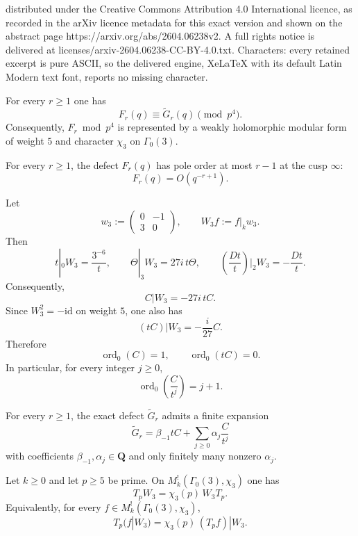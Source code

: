 \documentclass[10pt,a4paper]{amsart}
\DeclareMathOperator{\ord}{ord}
\newcommand{\Q}{\mathbf{Q}}
\begin{document}
distributed under the Creative Commons Attribution 4.0 International licence, as recorded in the arXiv licence metadata for this exact version and shown on the abstract page https://arxiv.org/abs/2604.06238v2. A full rights notice is delivered at licenses/arxiv-2604.06238-CC-BY-4.0.txt. Characters: every retained excerpt is pure ASCII, so the delivered engine, XeLaTeX with its default Latin Modern text font, reports no missing character.
\begin{proposition}\label{prop:defect-congruence}
For every $r\ge1$ one has
\[
F_r(q)\equiv \widetilde G_r(q)\pmod{p^4}.
\]
Consequently, $F_r\bmod p^4$ is represented by a weakly holomorphic modular form of weight $5$ and character $\chi_3$ on $\Gamma_0(3)$.
\end{proposition}

\begin{proposition}\label{prop:defect-pole-order}
For every $r\ge1$, the defect $F_r(q)$ has pole order at most $r-1$ at the cusp $\infty$:
\[
F_r(q)=O(q^{-r+1}).
\]
\end{proposition}

\begin{proposition}\label{prop:fricke-C}
Let
\[
w_3:=\begin{pmatrix}0&-1\\ 3&0\end{pmatrix},
\qquad
W_3f:=f|_k w_3.
\]
Then
\[
t|_0W_3=\frac{3^{-6}}{t},
\qquad
\Theta|_3W_3=27i\,t\Theta,
\qquad
\left(\frac{Dt}{t}\right)\!\Big|_2W_3=-\frac{Dt}{t}.
\]
Consequently,
\[
C|W_3=-27i\,tC.
\]
Since $W_3^2=-\mathrm{id}$ on weight $5$, one also has
\[
(tC)|W_3=-\frac{i}{27}C.
\]
Therefore
\[
\ord_0(C)=1,
\qquad
\ord_0(tC)=0.
\]
In particular, for every integer $j\ge0$,
\[
\ord_0\!\left(\frac{C}{t^j}\right)=j+1.
\]
\end{proposition}

\begin{proposition}\label{prop:rr-decomposition}
For every $r\ge1$, the exact defect $\widetilde G_r$ admits a finite expansion
\[
\widetilde G_r=\beta_{-1}tC+\sum_{j\ge0}\alpha_j\frac{C}{t^j}
\]
with coefficients $\beta_{-1},\alpha_j\in\Q$ and only finitely many nonzero $\alpha_j$.
\end{proposition}

\begin{lemma}\label{lem:fricke-hecke}
Let $k\ge0$ and let $p\ge5$ be prime. On $M_k^!(\Gamma_0(3),\chi_3)$ one has
\[
T_pW_3=\chi_3(p)\,W_3T_p.
\]
Equivalently, for every $f\in M_k^!(\Gamma_0(3),\chi_3)$,
\[
T_p(f|W_3)=\chi_3(p)\,(T_pf)|W_3.
\]
\end{lemma}
\end{document}
